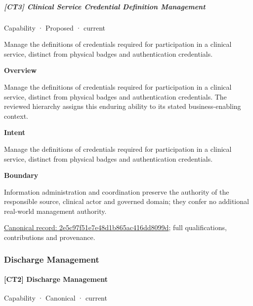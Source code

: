 \subparagraph{[CT3] Clinical Service Credential Definition Management}

\label{element:2e5c97f51e7e48d1b865ac416dd8099d}
{\small Capability · Proposed · current}\par

Manage the definitions of credentials required for participation in a clinical service, distinct from physical badges and authentication credentials.



\textbf{Overview}



Manage the definitions of credentials required for participation in a clinical service, distinct from physical badges and authentication credentials. The reviewed hierarchy assigns this enduring ability to its stated business-enabling context.



\textbf{Intent}



Manage the definitions of credentials required for participation in a clinical service, distinct from physical badges and authentication credentials.



\textbf{Boundary}



Information administration and coordination preserve the authority of the responsible source, clinical actor and governed domain; they confer no additional real-world management authority.


{\footnotesize \href{../../../../continuum/strategy/capability/2e5c97f51e7e48d1b865ac416dd8099d.md}{Canonical record: 2e5c97f51e7e48d1b865ac416dd8099d}; full qualifications, contributions and provenance.}\par
\subsubsection{Discharge Management}

\paragraph{[CT2] Discharge Management}

\label{element:ec5e8d6732764aa489c2dd7630fc8fef}
{\small Capability · Canonical · current}\par

